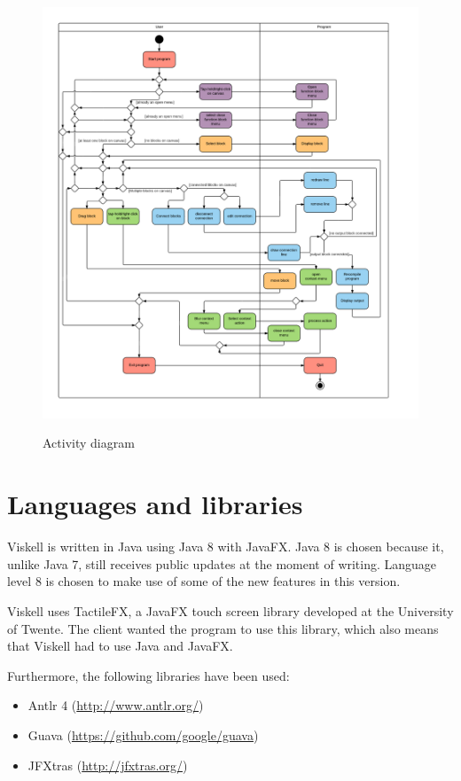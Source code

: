 \begin{figure}[p]
	\centering
	\includegraphics[width=\textwidth]{Images/activitydiagram}
	\label{fig:activitydiagram}
	\caption{Activity diagram}
\end{figure}

\section{Languages and libraries}

Viskell is written in Java using Java 8 with JavaFX.
Java 8 is chosen because it, unlike Java 7, still receives public updates at the moment of writing.
Language level 8 is chosen to make use of some of the new features in this version.

Viskell uses TactileFX, a JavaFX touch screen library developed at the University of Twente.
The client wanted the program to use this library, which also means that Viskell had to use Java and JavaFX.

Furthermore, the following libraries have been used:

\begin{itemize}
	\item Antlr 4 (\url{http://www.antlr.org/})
	\item Guava (\url{https://github.com/google/guava})
	\item JFXtras (\url{http://jfxtras.org/})
\end{itemize}

